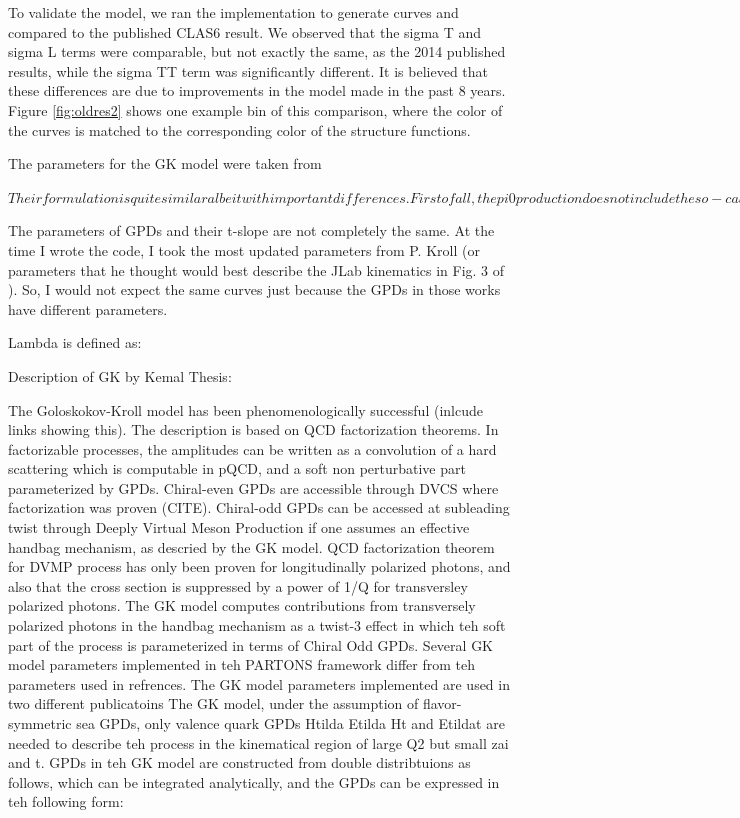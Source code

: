     To validate the model, we ran the implementation to generate curves and compared to the published CLAS6 result. We observed that the sigma T and sigma L terms were comparable, but not exactly the same, as the 2014 published results, while the sigma TT term was significantly different. It is believed that these differences are due to improvements in the model made in the past 8 years. Figure \ref{fig:oldres2} shows one example bin of this comparison, where the color of the curves is matched to the corresponding color of the structure functions.
    
    
    The parameters for the GK model were taken from 
    
    $
    Their formulation is quite similar albeit with important differences. First of all, the pi0 production does not include the so-called pion-pole contribution (see Eq. 4.39 - 4.42 in my thesis). Moreover, their handbag contributions are slightly different. Their differences at the handbag level are discussed in Eq. 4.37 and 4.38 in my thesis. $
    
    The parameters of GPDs and their t-slope are not completely the same. At the time I wrote the code, I took the most updated parameters from P. Kroll (or parameters that he thought would best describe the JLab kinematics in Fig. 3 of \cite{Diehl2020ExtractionKinematics} ). So, I would not expect the same curves just because the GPDs in those works have different parameters. 
    
    Lambda is defined as: %
    
    Description of GK by Kemal Thesis:
    
    The Goloskokov-Kroll model has been phenomenologically successful (inlcude links showing this).  The description is based on QCD factorization theorems. In factorizable processes, the amplitudes can be written as a convolution of a hard scattering which is computable in pQCD, and a soft non perturbative part parameterized by GPDs. Chiral-even GPDs are accessible through DVCS where factorization was proven (CITE). Chiral-odd GPDs can be accessed at subleading twist through Deeply Virtual Meson Production if one assumes an effective handbag mechanism, as descried by the GK model. 
    QCD factorization theorem for DVMP process has only been proven for longitudinally polarized photons, and also that the cross section is suppressed by a power of 1/Q for transversley polarized photons. 
    The GK model computes contributions from transversely polarized photons in the handbag mechanism as a twist-3 effect in which teh soft part of the process is parameterized in terms of Chiral Odd GPDs.
    Several GK model parameters implemented in teh PARTONS framework differ from teh parameters used in refrences. The GK model parameters implemented are used in two different publicatoins
    The GK model, under the assumption of flavor-symmetric sea GPDs, only valence quark GPDs Htilda Etilda Ht and Etildat are needed to describe teh process in the kinematical region of large Q2 but small zai and t. GPDs in teh GK model are constructed from double distribtuions as follows, which can be integrated analytically, and the GPDs can be expressed in teh following form:
    
